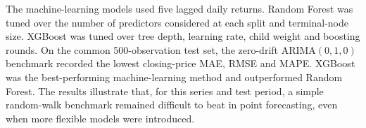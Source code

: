 \documentclass[10pt,a4paper]{article}
\begin{document}
The machine-learning models used five lagged daily returns. Random Forest was tuned over the number of predictors considered at each split and terminal-node size. XGBoost was tuned over tree depth, learning rate, child weight and boosting rounds. On the common 500-observation test set, the zero-drift ARIMA$(0,1,0)$ benchmark recorded the lowest closing-price MAE, RMSE and MAPE. XGBoost was the best-performing machine-learning method and outperformed Random Forest. The results illustrate that, for this series and test period, a simple random-walk benchmark remained difficult to beat in point forecasting, even when more flexible models were introduced.
\end{document}
